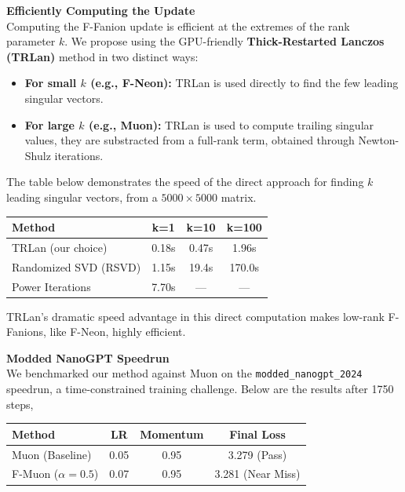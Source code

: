 \documentclass[fontsize=10pt]{beamer}
\begin{document}
\begin{frame}[fragile]
\begin{columns}[T]
\begin{column}{0.30\textwidth}
\vspace{0.5em}
\textbf{\Huge\color{Zen}Efficiently Computing the Update}\\[0.3em]

Computing the F-Fanion update is efficient at the extremes of the rank parameter $k$. We propose using the GPU-friendly \textbf{\color{HazySummerEve}Thick-Restarted Lanczos (TRLan)} method in two distinct ways:
\begin{itemize}
    \item \textbf{\color{HazySummerEve}For small $k$ (e.g., F-Neon):} TRLan is used directly to find the few leading singular vectors.
    \item \textbf{\color{HazySummerEve}For large $k$ (e.g., Muon):} TRLan is used to compute trailing singular values, they are substracted from a full-rank term, obtained through Newton-Shulz iterations.
\end{itemize}

The table below demonstrates the speed of the direct approach for finding $k$ leading singular vectors, from a $5000 \times 5000$ matrix. 

{
\centering
\begin{tabular}{lccc}
\toprule
\textbf{Method} & \textbf{k=1} & \textbf{k=10} & \textbf{k=100} \\
\midrule
TRLan (our choice) & 0.18s & 0.47s & 1.96s \\
Randomized SVD (RSVD)       & 1.15s          & 19.4s          & 170.0s \\
Power Iterations            & 7.70s          & ---            & --- \\
\bottomrule
\end{tabular}
\par
\vspace{0.5em}
}

TRLan's dramatic speed advantage in this direct computation makes low-rank F-Fanions, like F-Neon, highly efficient.

\vspace{0.5em}
\textbf{\Huge\color{Zen}Modded NanoGPT Speedrun}\\[0.3em]

We benchmarked our method against Muon on the \texttt{modded\_nanogpt\_2024} speedrun, a time-constrained training challenge. Below are the results after 1750 steps, 

{
\centering
\begin{tabular}{lccc}
\toprule
\textbf{Method} & \textbf{LR} & \textbf{Momentum} & \textbf{Final Loss} \\
\midrule
Muon (Baseline) & 0.05 & 0.95 & 3.279 (Pass) \\
F-Muon ($\alpha=0.5$) & 0.07 & 0.95 & 3.281 (Near Miss) \\
\bottomrule
\end{tabular}
\par
}


\end{column}
\end{columns}
\end{frame}
\end{document}
